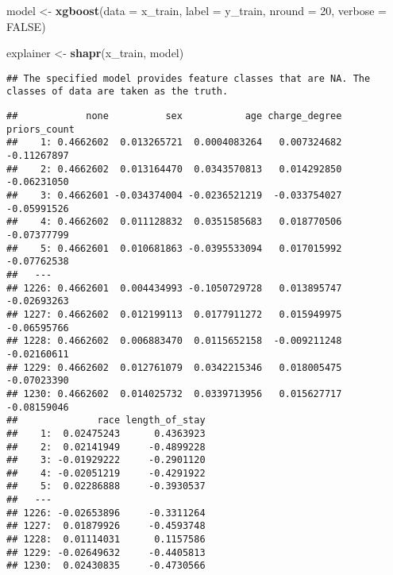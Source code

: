 \documentclass[
]{article}
\newenvironment{Shaded}{\begin{snugshade}}{\end{snugshade}}
\newcommand{\AttributeTok}[1]{\textcolor[rgb]{0.13,0.29,0.53}{#1}}
\newcommand{\ConstantTok}[1]{\textcolor[rgb]{0.56,0.35,0.01}{#1}}
\newcommand{\DecValTok}[1]{\textcolor[rgb]{0.00,0.00,0.81}{#1}}
\newcommand{\FunctionTok}[1]{\textcolor[rgb]{0.13,0.29,0.53}{\textbf{#1}}}
\newcommand{\NormalTok}[1]{#1}
\newcommand{\OtherTok}[1]{\textcolor[rgb]{0.56,0.35,0.01}{#1}}
\newcommand{\SpecialCharTok}[1]{\textcolor[rgb]{0.81,0.36,0.00}{\textbf{#1}}}
\newcommand{\StringTok}[1]{\textcolor[rgb]{0.31,0.60,0.02}{#1}}
\begin{document}
\begin{Shaded}
\begin{Highlighting}[]
\NormalTok{model }\OtherTok{\textless{}{-}} \FunctionTok{xgboost}\NormalTok{(}\AttributeTok{data =}\NormalTok{ x\_train, }\AttributeTok{label =}\NormalTok{ y\_train, }\AttributeTok{nround =} \DecValTok{20}\NormalTok{, }\AttributeTok{verbose =} \ConstantTok{FALSE}\NormalTok{)}

\NormalTok{explainer }\OtherTok{\textless{}{-}} \FunctionTok{shapr}\NormalTok{(x\_train, model)}
\end{Highlighting}
\end{Shaded}

\begin{verbatim}
## The specified model provides feature classes that are NA. The classes of data are taken as the truth.
\end{verbatim}

\begin{Shaded}
\end{Shaded}

\begin{verbatim}
##            none          sex           age charge_degree priors_count
##    1: 0.4662602  0.013265721  0.0004083264   0.007324682  -0.11267897
##    2: 0.4662602  0.013164470  0.0343570813   0.014292850  -0.06231050
##    3: 0.4662601 -0.034374004 -0.0236521219  -0.033754027  -0.05991526
##    4: 0.4662602  0.011128832  0.0351585683   0.018770506  -0.07377799
##    5: 0.4662601  0.010681863 -0.0395533094   0.017015992  -0.07762538
##   ---                                                                
## 1226: 0.4662601  0.004434993 -0.1050729728   0.013895747  -0.02693263
## 1227: 0.4662602  0.012199113  0.0177911272   0.015949975  -0.06595766
## 1228: 0.4662602  0.006883470  0.0115652158  -0.009211248  -0.02160611
## 1229: 0.4662602  0.012761079  0.0342215346   0.018005475  -0.07023390
## 1230: 0.4662602  0.014025732  0.0339713956   0.015627717  -0.08159046
##              race length_of_stay
##    1:  0.02475243      0.4363923
##    2:  0.02141949     -0.4899228
##    3: -0.01929222     -0.2901120
##    4: -0.02051219     -0.4291922
##    5:  0.02286888     -0.3930537
##   ---                           
## 1226: -0.02653896     -0.3311264
## 1227:  0.01879926     -0.4593748
## 1228:  0.01114031      0.1157586
## 1229: -0.02649632     -0.4405813
## 1230:  0.02430835     -0.4730566
\end{verbatim}
\end{document}
